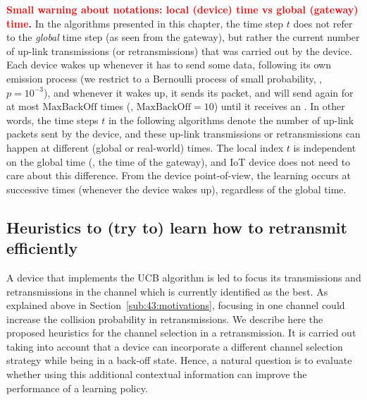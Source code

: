 \begin{leftbar}[warningbar]  %
		\textbf{\textcolor{red}{Small warning about notations: local (device) time vs global (gateway) time}.}
		In the algorithms presented in this chapter, the time step $t$ does not refer to the \emph{global} time step (as seen from the gateway), but rather the current number of up-link transmissions (or retransmissions) that was carried out by the device.
		Each device wakes up whenever it has to send some data, following its own emission process (we restrict to a Bernoulli process of small probability, \eg, $p=10^{-3}$), and whenever it wakes up, it sends its packet, and will send again for at most $\mathrm{MaxBackOff}$ times (\eg, $\mathrm{MaxBackOff}=10$) until it receives an \Ack.
		In other words, the time steps $t$ in the following algorithms denote the number of up-link packets sent by the device, and these up-link transmissions or retransmissions can happen at different (global or real-world) times.
		The local index $t$ is independent on the global time (\ie, the time of the gateway), and IoT device does not need to care about this difference.
		From the device point-of-view, the learning occurs at successive times (whenever the device wakes up), regardless of the global time.
\end{leftbar}  %


\subsection{Heuristics to (try to) learn how to retransmit efficiently}
\label{sub:43:heuristics}

A device that implements the UCB algorithm is led to focus its transmissions and retransmissions in the channel which is currently identified as the best.
As explained above in Section~\ref{sub:43:motivations}, focusing in one channel could increase the collision probability in retransmissions.
We describe here the proposed heuristics for the channel selection in a retransmission. It is carried out taking into account that a device can incorporate a different channel selection strategy while being in a back-off state.
Hence, a natural question is to evaluate whether using this additional contextual information can improve the performance of a learning policy.

